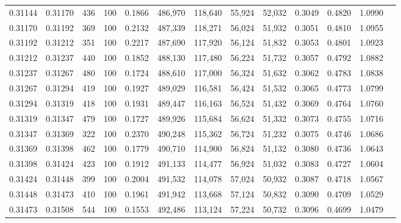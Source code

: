 \begin{tabular}{rrrrrrrrrrrrr}
0.31144 & 0.31170 &   436 & 100 &                                     0.1866 & 486,970 & 118,640 &  55,924 &  52,032 & 0.3049 & 0.4820 & 1.0990 \\
0.31170 & 0.31192 &   369 & 100 &                                     0.2132 & 487,339 & 118,271 &  56,024 &  51,932 & 0.3051 & 0.4810 & 1.0955 \\
0.31192 & 0.31212 &   351 & 100 &                                     0.2217 & 487,690 & 117,920 &  56,124 &  51,832 & 0.3053 & 0.4801 & 1.0923 \\
0.31212 & 0.31237 &   440 & 100 &                                     0.1852 & 488,130 & 117,480 &  56,224 &  51,732 & 0.3057 & 0.4792 & 1.0882 \\
0.31237 & 0.31267 &   480 & 100 &                                     0.1724 & 488,610 & 117,000 &  56,324 &  51,632 & 0.3062 & 0.4783 & 1.0838 \\
0.31267 & 0.31294 &   419 & 100 &                                     0.1927 & 489,029 & 116,581 &  56,424 &  51,532 & 0.3065 & 0.4773 & 1.0799 \\
0.31294 & 0.31319 &   418 & 100 &                                     0.1931 & 489,447 & 116,163 &  56,524 &  51,432 & 0.3069 & 0.4764 & 1.0760 \\
0.31319 & 0.31347 &   479 & 100 &                                     0.1727 & 489,926 & 115,684 &  56,624 &  51,332 & 0.3073 & 0.4755 & 1.0716 \\
0.31347 & 0.31369 &   322 & 100 &                                     0.2370 & 490,248 & 115,362 &  56,724 &  51,232 & 0.3075 & 0.4746 & 1.0686 \\
0.31369 & 0.31398 &   462 & 100 &                                     0.1779 & 490,710 & 114,900 &  56,824 &  51,132 & 0.3080 & 0.4736 & 1.0643 \\
0.31398 & 0.31424 &   423 & 100 &                                     0.1912 & 491,133 & 114,477 &  56,924 &  51,032 & 0.3083 & 0.4727 & 1.0604 \\
0.31424 & 0.31448 &   399 & 100 &                                     0.2004 & 491,532 & 114,078 &  57,024 &  50,932 & 0.3087 & 0.4718 & 1.0567 \\
0.31448 & 0.31473 &   410 & 100 &                                     0.1961 & 491,942 & 113,668 &  57,124 &  50,832 & 0.3090 & 0.4709 & 1.0529 \\
0.31473 & 0.31508 &   544 & 100 &                                     0.1553 & 492,486 & 113,124 &  57,224 &  50,732 & 0.3096 & 0.4699 & 1.0479 \\

\end{tabular}
